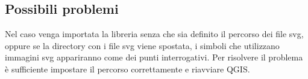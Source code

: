 \documentclass[11pt]{article}
\begin{document}
\subsection{Possibili problemi}
\label{sec:org634e39f}
Nel caso venga importata la libreria senza che sia definito il percorso dei
file svg, oppure se la directory con i file svg viene spostata, i simboli che
utilizzano immagini svg appariranno come dei punti interrogativi. Per
risolvere il problema è sufficiente impostare il percorso correttamente e
riavviare QGIS. 
\end{document}

